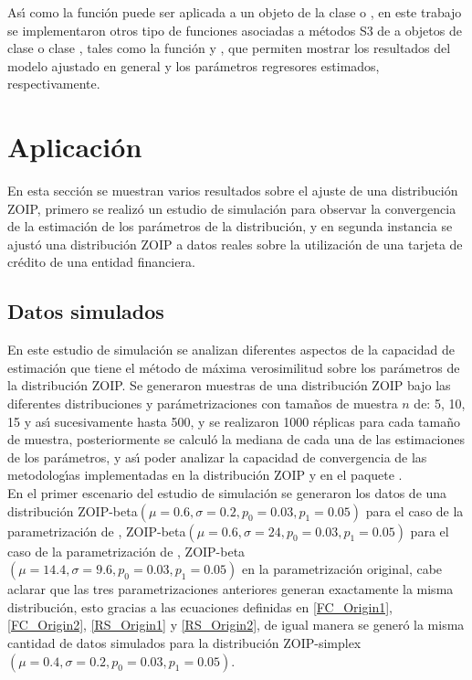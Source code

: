 As\'{\i} como la funci\'{o}n  puede ser aplicada a un objeto de la clase  o , en este trabajo se implementaron otros tipo de funciones asociadas a m\'{e}todos S3 de  a objetos de clase  o clase , tales como la funci\'{o}n  y , que permiten mostrar los resultados del modelo ajustado en general y los par\'{a}metros regresores estimados, respectivamente.


\section{Aplicaci\'{o}n}
En esta secci\'{o}n se muestran varios resultados sobre el ajuste de una distribuci\'{o}n ZOIP, primero se realiz\'{o} un estudio de simulaci\'{o}n para observar la convergencia de la estimaci\'{o}n de los par\'{a}metros de la distribuci\'{o}n, y en segunda instancia se ajust\'{o} una distribuci\'{o}n ZOIP a datos reales sobre la utilizaci\'{o}n de una tarjeta de cr\'{e}dito de una entidad financiera.

\subsection{Datos simulados}
En este estudio de simulaci\'{o}n se analizan diferentes aspectos de la capacidad de estimaci\'{o}n que tiene el m\'{e}todo de m\'{a}xima verosimilitud sobre los par\'{a}metros de la distribuci\'{o}n ZOIP. Se generaron muestras de una distribuci\'{o}n ZOIP bajo las diferentes distribuciones y par\'{a}metrizaciones con tama\~{n}os de muestra $n$ de: 5, 10, 15 y as\'{\i} sucesivamente hasta 500, y se realizaron 1000 r\'{e}plicas para cada tama\~{n}o de muestra, posteriormente se calcul\'{o} la mediana de cada una de las estimaciones de los par\'{a}metros, y as\'{\i} poder analizar la capacidad de convergencia de las metodolog\'{\i}as implementadas en la distribuci\'{o}n ZOIP y en el paquete .\\

En el primer escenario del estudio de simulaci\'{o}n se generaron los datos de una distribuci\'{o}n ZOIP-beta$(\mu=0.6 ,\sigma=0.2 , p_0=0.03 , p_1= 0.05)$ para el caso de la parametrizaci\'{o}n de \cite{Stasinopoulos2}, ZOIP-beta$(\mu=0.6 , \sigma=24 , p_0=0.03 , p_1= 0.05)$ para el caso de la parametrizaci\'{o}n de \cite{Ferrari2}, ZOIP-beta$(\mu=14.4 , \sigma=9.6 , p_0=0.03 , p_1= 0.05)$ en la parametrizaci\'{o}n original, cabe aclarar que las tres parametrizaciones anteriores generan exactamente la misma distribuci\'{o}n, esto gracias a las ecuaciones definidas en \eqref{FC_Origin1}, \eqref{FC_Origin2}, \eqref{RS_Origin1} y \eqref{RS_Origin2}, de igual manera se gener\'{o} la misma cantidad de datos simulados para la distribuci\'{o}n ZOIP-simplex$(\mu=0.4 , \sigma=0.2 , p_0=0.03 , p_1= 0.05)$.\\


